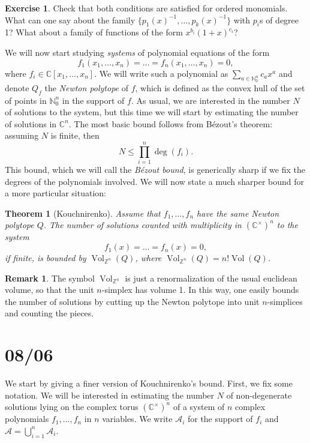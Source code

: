 \documentclass[11pt, a4paper]{article}
\newcommand{\NN}{\mathbb{N}}
\newcommand{\ZZ}{\mathbb{Z}}
\newcommand{\CC}{\mathbb{C}}
\DeclareMathOperator{\Vol}{Vol}
\theoremstyle{plain}
\newtheorem{thm}[prop]{Theorem}
\theoremstyle{definition}
\newtheorem{rem}[prop]{Remark}
\newtheorem{ex}[prop]{Exercise}
\begin{document}
\begin{ex} Check that both conditions are satisfied for ordered monomials. What can one say about the family $\{p_1(x)^{-1},\dots,p_k(x)^{-1}\}$ with $p_i$s of degree 1? What about a family of functions of the form $x^{b_i}(1+x)^{c_i}$?
\end{ex}

We will now start studying \emph{systems} of polynomial equations of the form
\[f_1(x_1,\dots,x_n)=\dots=f_n(x_1,\dots,x_n)=0,\]
where $f_i\in \CC[x_1,\dots,x_n]$. We will write such a polynomial as $\sum_{a\in \NN_0^n} c_a x^a$ and denote $Q_f$ the \emph{Newton polytope} of $f$, which is defined as the convex hull of the set of points in $\NN_0^n$ in the support of $f$. As usual, we are interested in the number $N$ of solutions to the system, but this time we will start by estimating the number of solutions in $\CC^n$. The most basic bound follows from Bézout's theorem: assuming $N$ is finite, then
\[N\leq \prod_{i=1}^n \deg(f_i).\]
This bound, which we will call the \emph{Bézout bound}, is generically sharp if we fix the degrees of the polynomials involved. We will now state a much sharper bound for a more particular situation:
\begin{thm}[Kouchnirenko] Assume that $f_1,\dots,f_n$ have the same Newton polytope $Q$. The number of solutions counted with multiplicity in $(\CC^\times)^n$ to the system
\[f_1(x)=\dots=f_n(x)=0,\]
if finite, is bounded by $\Vol_{\ZZ^n}(Q)$, where $\Vol_{\ZZ^n}(Q) = n! \Vol(Q)$.
\end{thm}
\begin{rem} The symbol $\Vol_{\ZZ^n}$ is just a renormalization of the usual euclidean volume, so that the unit $n$-simplex has volume 1. In this way, one easily bounds the number of solutions by cutting up the Newton polytope into unit $n$-simplices and counting the pieces.
\end{rem}

\section{08/06}

We start by giving a finer version of Kouchnirenko's bound. First, we fix some notation. We will be interested in estimating the number $N$ of non-degenerate solutions lying on the complex torus $(\CC^\times)^n$ of a system of $n$ complex polynomials $f_1,\dots,f_n$ in $n$ variables. We write $\mathcal{A}_i$ for the support of $f_i$ and $\mathcal{A}=\bigcup_{i=1}^n\mathcal{A}_i$.
\end{document}
